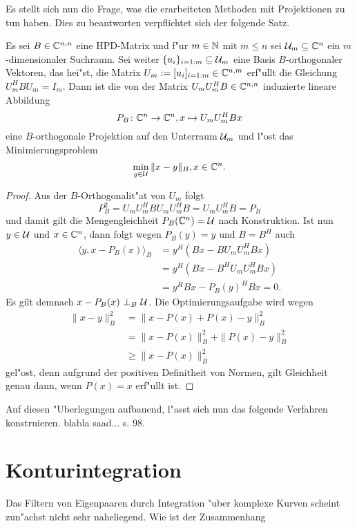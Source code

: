 Es stellt sich nun die Frage, was die erarbeiteten Methoden mit Projektionen zu
tun haben. Dies zu beantworten verpflichtet sich der folgende Satz.

\begin{thm}
Es sei $B\in\mathbb{C}^{n,n}$ eine HPD-Matrix und f"ur $m\in\mathbb{N}$ mit $m\le n$ sei $\mathcal{U}_m \subseteq \mathbb{C}^n$
ein $m$-dimensionaler Suchraum. Sei weiter $\{u_i\}_{i=1:m}\subseteq\mathcal{U}_m$ eine
Basis $B$-orthogonaler Vektoren, das hei"st, die Matrix $U_m := [u_i]_{i=1:m}
\in\mathbb{C}^{n,m}$ erf"ullt die Gleichung $U_m^H B U_m = I_m$. Dann ist die von der Matrix
 $U_m U_m^H B \in \mathbb{C}^{n,n}$ induzierte lineare Abbildung
\[
P_B \colon \mathbb{C}^n \to \mathbb{C}^n, x\mapsto U_m U_m^H Bx
\]
eine $B$-orthogonale Projektion auf den Unterraum $\mathcal{U}_m$ und l"ost das Minimierungsproblem
\[
\min_{y\in\mathcal{U}} \|x - y\|_B, x\in\mathbb{C}^n.
\]
\end{thm}

\begin{proof}
Aus der $B$-Orthogonalit"at von $U_m$ folgt
\[
P_B^2 = U_m U_m^H B U_m U_m^H B = U_m U_m^H B = P_B
\]
und damit gilt die Mengengleichheit $P_B(\mathbb{C}^n) = \mathcal{U}$ nach Konstruktion. %
Ist nun $y\in\mathcal{U}$ und $x\in\mathbb{C}^n$, dann folgt wegen $P_B (y) = y$ und $B=B^H$ auch
\begin{align*}
\langle y, x-P_B(x)\rangle_B &= y^H (Bx - B U_m U_m^H Bx) \\
&= y^H (Bx - B^H U_m U_m^H Bx) \\
&= y^H Bx - P_B(y)^H Bx = 0.
\end{align*}
Es gilt demnach $x-P_B(x) \ \bot_B \ \mathcal{U}$. Die Optimierungsaufgabe wird wegen
\begin{align*}
\|x-y\|_B^2 &= \|x-P(x) + P(x)-y\|_B^2 \\
&= \|x-P(x)\|_B^2 + \|P(x)-y\|_B^2\\
&\ge \|x-P(x)\|_B^2
\end{align*}
gel"ost, denn aufgrund der positiven Definitheit von Normen, gilt Gleichheit genau dann,
wenn $P(x)=x$ erf"ullt ist.
\end{proof}


Auf diesen "Uberlegungen aufbauend, l"asst sich nun das folgende Verfahren konstruieren.
blabla saad... s. 98.


\section{Konturintegration}
Das Filtern von Eigenpaaren durch Integration "uber komplexe Kurven scheint
zun"achst nicht sehr naheliegend. Wie ist der Zusammenhang



